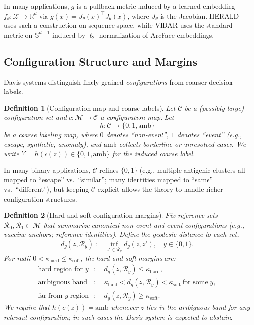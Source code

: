 \documentclass[11pt]{article}
\newtheorem{definition}{Definition}
\theoremstyle{remark}
\theoremstyle{plain}
\begin{document}
In many applications, $g$ is a pullback metric induced by a learned embedding
$f_\theta:\mathcal{X} \to \mathbb{R}^d$ via $g(x) = J_\theta(x)^\top J_\theta(x)$, where
$J_\theta$ is the Jacobian. HERALD uses such a construction on sequence space, while VIDAR
uses the standard metric on $\mathbb{S}^{d-1}$ induced by $\ell_2$-normalization of
ArcFace embeddings.

\subsection{Configuration Structure and Margins}
\label{subsec:config}

Davis systems distinguish finely-grained \emph{configurations} from coarser decision labels.

\begin{definition}[Configuration map and coarse labels]
Let $\mathcal{C}$ be a (possibly large) configuration set and
$c:\mathcal{M} \to \mathcal{C}$ a configuration map. Let
\[
    h:\mathcal{C} \to \{0,1,\mathrm{amb}\}
\]
be a coarse labeling map, where $0$ denotes ``non-event'', $1$ denotes ``event'' (e.g.,
escape, synthetic, anomaly), and $\mathrm{amb}$ collects borderline or unresolved cases.
We write $Y = h(c(z)) \in \{0,1,\mathrm{amb}\}$ for the induced coarse label.
\end{definition}

In many binary applications, $\mathcal{C}$ refines $\{0,1\}$ (e.g., multiple antigenic clusters
all mapped to ``escape'' vs.\ ``similar''; many identities mapped to ``same'' vs.\ ``different''), but
keeping $\mathcal{C}$ explicit allows the theory to handle richer configuration structures.

\begin{definition}[Hard and soft configuration margins]\label{def:davis-config}
Fix reference sets $\mathcal{R}_0,\mathcal{R}_1 \subset \mathcal{M}$ that summarize
canonical non-event and event configurations (e.g., vaccine anchors; reference identities).
Define the geodesic distance to each set,
\[
    d_g(z,\mathcal{R}_y) := \inf_{z'\in\mathcal{R}_y} d_g(z,z'), \quad y\in\{0,1\}.
\]
For radii $0 < \kappa_{\mathrm{hard}} \le \kappa_{\mathrm{soft}}$, the hard and soft
margins are:
\begin{align*}
    \text{hard region for } y &: \quad d_g(z,\mathcal{R}_y) \le \kappa_{\mathrm{hard}},\\
    \text{ambiguous band} &: \quad \kappa_{\mathrm{hard}} < d_g(z,\mathcal{R}_y)
        < \kappa_{\mathrm{soft}}\ \text{for some $y$}, \\
    \text{far-from-$y$ region} &: \quad d_g(z,\mathcal{R}_y) \ge \kappa_{\mathrm{soft}}.
\end{align*}
We require that $h(c(z)) = \mathrm{amb}$ whenever $z$ lies in the ambiguous band for
any relevant configuration; in such cases the Davis system is expected to abstain.
\end{definition}
\end{document}
